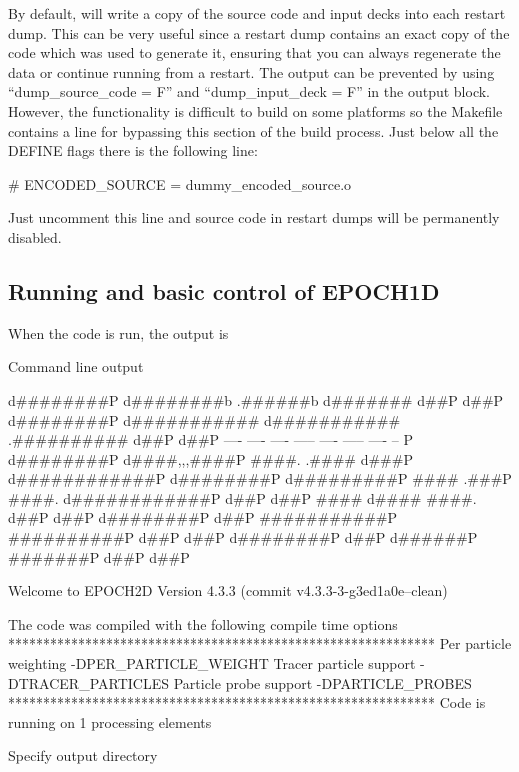 By default, {\EPOCH} will write a copy of the source code and input decks
into each restart dump. This can be very useful since a restart dump contains
an exact copy of the code which was used to generate it, ensuring that you
can always regenerate the data or continue running from a restart.
The output can be prevented by using ``dump\_source\_code = F'' and
``dump\_input\_deck = F'' in the output block.
However, the functionality is difficult to build on some platforms so
the Makefile contains a line for bypassing this section of the build
process. Just below all the DEFINE flags there is the following line:
\begin{boxverbatim}
# ENCODED_SOURCE = dummy_encoded_source.o
\end{boxverbatim}
Just uncomment this line and source code in restart dumps will be permanently
disabled.


\subsection{Running {\EPOCH} and basic control of EPOCH1D}
When the code is run, the output is
{\samepage
\begin{lboxverbatim}{Command line output}

        d########P  d########b        .######b          d#######  d##P      d##P
       d########P  d###########    d###########     .##########  d##P      d##P
      ----        ----     ----  -----     ----   -----         ----      -- P
     d########P  d####,,,####P ####.      .#### d###P          d############P
    d########P  d#########P   ####       .###P ####.          d############P
   d##P        d##P           ####     d####   ####.         d##P      d##P
  d########P  d##P            ###########P     ##########P  d##P      d##P
 d########P  d##P              d######P          #######P  d##P      d##P

 Welcome to EPOCH2D Version 4.3.3   (commit v4.3.3-3-g3ed1a0e--clean)

 The code was compiled with the following compile time options
 *************************************************************
 Per particle weighting -DPER_PARTICLE_WEIGHT
 Tracer particle support -DTRACER_PARTICLES
 Particle probe support -DPARTICLE_PROBES
 *************************************************************
 Code is running on 1 processing elements

 Specify output directory
\end{lboxverbatim}
}

